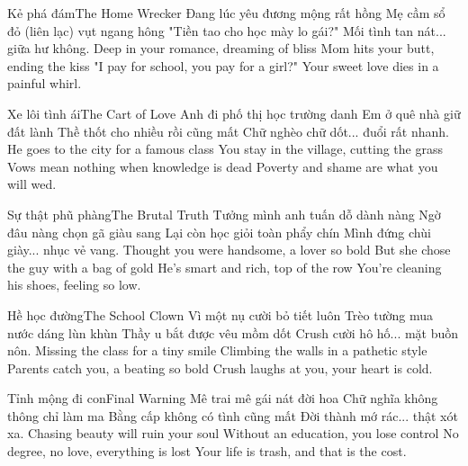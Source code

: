 \begin{tutuyetbox}{Kẻ phá đám}{The Home Wrecker}
Đang lúc yêu đương mộng rất hồng
Mẹ cầm sổ đỏ (liên lạc) vụt ngang hông
"Tiền tao cho học mày lo gái?"
Mối tình tan nát... giữa hư không.
\tcblower
Deep in your romance, dreaming of bliss
Mom hits your butt, ending the kiss
"I pay for school, you pay for a girl?"
Your sweet love dies in a painful whirl.
\end{tutuyetbox}

\begin{tutuyetbox}{Xe lôi tình ái}{The Cart of Love}
Anh đi phố thị học trường danh
Em ở quê nhà giữ đất lành
Thề thốt cho nhiều rồi cũng mất
Chữ nghèo chữ dốt... đuổi rất nhanh.
\tcblower
He goes to the city for a famous class
You stay in the village, cutting the grass
Vows mean nothing when knowledge is dead
Poverty and shame are what you will wed.
\end{tutuyetbox}

\begin{tutuyetbox}{Sự thật phũ phàng}{The Brutal Truth}
Tưởng mình anh tuấn dỗ dành nàng
Ngờ đâu nàng chọn gã giàu sang
Lại còn học giỏi toàn phẩy chín
Mình đứng chùi giày... nhục vẻ vang.
\tcblower
Thought you were handsome, a lover so bold
But she chose the guy with a bag of gold
He's smart and rich, top of the row
You're cleaning his shoes, feeling so low.
\end{tutuyetbox}

\begin{tutuyetbox}{Hề học đường}{The School Clown}
Vì một nụ cười bỏ tiết luôn
Trèo tường mua nước dáng lùn khùn
Thầy u bắt được vêu mồm dốt
Crush cười hô hố... mặt buồn nôn.
\tcblower
Missing the class for a tiny smile
Climbing the walls in a pathetic style
Parents catch you, a beating so bold
Crush laughs at you, your heart is cold.
\end{tutuyetbox}

\begin{tutuyetbox}{Tỉnh mộng đi con}{Final Warning}
Mê trai mê gái nát đời hoa
Chữ nghĩa không thông chỉ làm ma
Bằng cấp không có tình cũng mất
Đời thành mớ rác... thật xót xa.
\tcblower
Chasing beauty will ruin your soul
Without an education, you lose control
No degree, no love, everything is lost
Your life is trash, and that is the cost.
\end{tutuyetbox}

